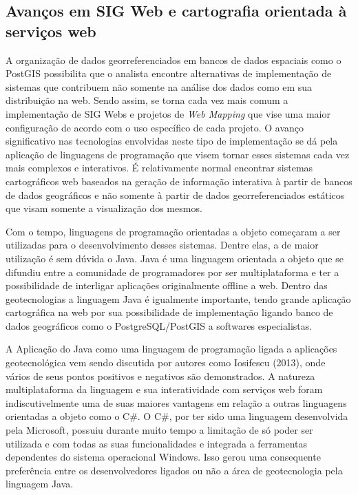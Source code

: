 		\subsection{Avanços em SIG Web e cartografia orientada à serviços web}
		
		A organização de dados georreferenciados em bancos de dados espaciais como o PostGIS possibilita que o analista encontre alternativas de implementação de sistemas que contribuem não somente na análise dos dados como em sua distribuição na web. Sendo assim, se torna cada vez mais comum a implementação de SIG Webs e projetos de\textit{ Web Mapping} que vise uma maior configuração de acordo com o uso específico de cada projeto. O avanço significativo nas tecnologias envolvidas neste tipo de implementação se dá pela aplicação de linguagens de programação que visem tornar esses sistemas cada vez mais complexos e interativos. É relativamente normal encontrar sistemas cartográficos web baseados na geração de informação interativa à partir de bancos de dados geográficos e não somente à partir de dados georreferenciados estáticos que visam somente a visualização dos mesmos.
		
		Com o tempo, linguagens de programação orientadas a objeto começaram a ser utilizadas para o desenvolvimento desses sistemas. Dentre elas, a de maior utilização é sem dúvida o Java. Java é uma linguagem orientada a objeto que se difundiu entre a comunidade de programadores por ser multiplataforma e ter a possibilidade de interligar aplicações originalmente offline a web. Dentro das geotecnologias a linguagem Java é igualmente importante, tendo grande aplicação cartográfica na web por sua possibilidade de implementação ligando banco de dados geográficos como o PostgreSQL/PostGIS a softwares especialistas.
		
		A Aplicação do Java como uma linguagem de programação ligada a aplicações geotecnológica vem sendo discutida por autores como Iosifescu (2013), onde vários de seus pontos positivos e negativos são demonstrados. A natureza multiplataforma da linguagem e sua interatividade com serviços web foram indiscutivelmente uma de suas maiores vantagens em relação a outras linguagens orientadas a objeto como o C\#. O C\#, por ter sido uma linguagem desenvolvida pela Microsoft, possuiu durante muito tempo a limitação de só poder ser utilizada e com todas as suas funcionalidades e integrada a ferramentas dependentes do sistema operacional Windows. Isso gerou uma consequente preferência entre os desenvolvedores ligados ou não a área de geotecnologia pela linguagem Java. 
		
